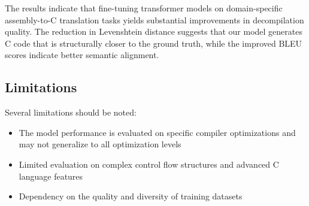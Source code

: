 \documentclass[../main.tex]{subfiles}
\begin{document}
The results indicate that fine-tuning transformer models on domain-specific assembly-to-C translation tasks yields substantial improvements in decompilation quality. The reduction in Levenshtein distance suggests that our model generates C code that is structurally closer to the ground truth, while the improved BLEU scores indicate better semantic alignment.

\subsection{Limitations}

Several limitations should be noted:
\begin{itemize}
\item The model performance is evaluated on specific compiler optimizations and may not generalize to all optimization levels
\item Limited evaluation on complex control flow structures and advanced C language features
\item Dependency on the quality and diversity of training datasets
\end{itemize}
\end{document}
